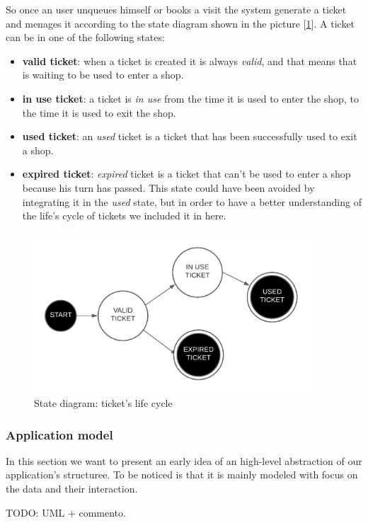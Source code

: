 So once an user unqueues himself or books a visit the system generate a ticket and menages it according to the state diagram shown in the picture [\ref{fig:ticketlifecycle}]. A ticket can be in one of the following states:
\begin{itemize}[topsep=0pt]
    \item \textbf{valid ticket}: when a ticket is created it is always \textit{valid}, and that means that is waiting to be used to enter a shop.
    \item \textbf{in use ticket}: a ticket is \textit{in use} from the time it is used to enter the shop, to the time it is used to exit the shop.
    \item \textbf{used ticket}: an \textit{used} ticket is a ticket that has been successfully used to exit a shop. 
    \item \textbf{expired ticket}: \textit{expired} ticket is a ticket that can't be used to enter a shop because his turn has passed. This state could have been avoided by integrating it in the \textit{used} state, but in order to have a better understanding of the life's cycle of tickets we included it in here. 
\end{itemize}

\begin{figure}[h!]
    \centering
    \includegraphics[height=6cm]{Images/statediagrams/ticketlifecycle.png}
    \caption{\label{fig:ticketlifecycle}State diagram: ticket's life cycle}
\end{figure}

\FloatBarrier

\subsubsection{Application model}
\label{subsubsect:applicationstructure}

In this section we want to present an early idea of an high-level abstraction of our application's structuree. To be noticed is that it is mainly modeled with focus on the data and their interaction.

TODO: UML + commento.